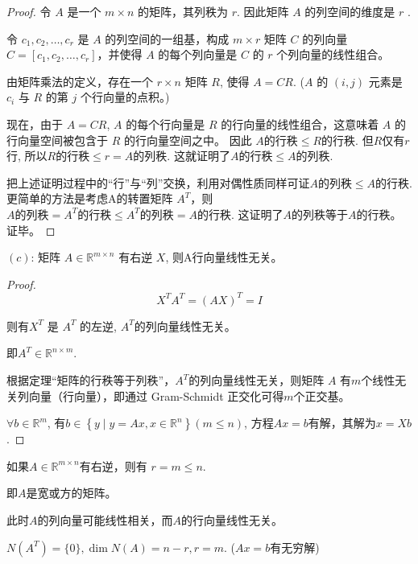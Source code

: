 \begin{proof}
    令 $A$ 是一个 $m\times n$ 的矩阵，其列秩为 $r $. 因此矩阵 $A$ 的列空间的维度是 $r$ . 
    
    令 $c_1,c_2,\ldots,c_r$ 是 $A$ 的列空间的一组基，构成 $m \times r$ 矩阵 $C$ 的列向量 $C = [c_1,c_2,\ldots,c_r]$，并使得 $A$ 的每个列向量是 $C$ 的 $r$ 个列向量的线性组合。 
    
    由矩阵乘法的定义，存在一个 $r \times n$ 矩阵 $R$, 使得 $A = CR$. ($A$ 的 $(i,j)$ 元素是 $c_i$ 与 $R$ 的第 $j$ 个行向量的点积。)

现在，由于 $A = CR$, $A$ 的每个行向量是 $R$ 的行向量的线性组合，这意味着 $A$ 的行向量空间被包含于 $R$ 的行向量空间之中。 因此 $A 的行秩 \leq R的行秩$. 但$R$仅有$r$行, 所以$R的行秩 \leq r = A的列秩$. 这就证明了$A的行秩 \leq A的列秩$.

把上述证明过程中的“行”与“列”交换，利用对偶性质同样可证$A的列秩 \leq A的行秩$. 更简单的方法是考虑A的转置矩阵 $A^ {T}$，则$A的列秩 =  A^ {T}的行秩 \leq  A^ {T}的列秩 = A的行秩$. 这证明了$A$的列秩等于$A$的行秩。 证毕。
\end{proof}

\begin{theorem}
    $(c)$: 矩阵 $ A \in \mathbb{R}^{m \times n} $ 有右逆 $ X $, 则A行向量线性无关。
\end{theorem}

\begin{proof}
    $$  {X}^{T} A^{T}=(A X)^{T}=I $$
    
    则有$  {X}^{T} $ 是 $ A^{T} $ 的左逆, $ A^{T} $的列向量线性无关。  

    即$ A^{T} \in \mathbb{R}^{n \times m} $.
    
    根据定理“矩阵的行秩等于列秩”，$ A^{T} $的列向量线性无关，则矩阵 $ A $ 有$m$个线性无关列向量（行向量），即通过 Gram-Schmidt 正交化可得$m$个正交基。 

    $ \forall b \in \mathbb{R}^{m} $, 有$ b \in\left\{y \mid y=A x, x \in \mathbb{R}^{n}\right\} (m \leq n ) $, 方程$ A x=b $有解，其解为$ x=X b $. 
\end{proof}

\begin{corollary}
    如果$ A \in \mathbb{R}^{m \times n} $有右逆，则有 $r= m \leq n  $. 

   即$A$是宽或方的矩阵。 

   此时$A$的列向量可能线性相关，而$A$的行向量线性无关。 
   
   $N(A^T) = \{0\}, \operatorname{dim} N(A) = n-r, r=m$. ($Ax=b$有无穷解) 
   \end{corollary}

